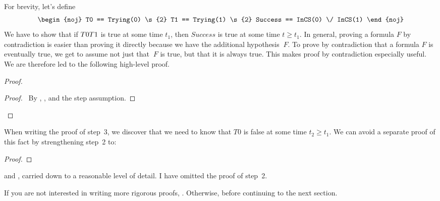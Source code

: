 \documentclass[fleqn,leqno]{article}
\begin{document}
For brevity, let's define
   \[ \begin{noj}
      T0 == Trying(0) \s{2} T1 == Trying(1) \s{2}
      Success == InCS(0) \/ InCS(1)
      \end{noj}
  \]
We have to show that if $T0 \/ T1$ is true at some time $t_{1}$, then
$Success$ is true at some time $t\geq t_{1}$.  In general, proving
a formula $F$ by contradiction is 
easier than proving it directly because we have the additional
hypothesis $~F$.  To prove by contradiction that a formula $F$ is
eventually true, we get to assume not just that $~F$ is true, but that
it is always true.  This makes proof by contradiction especially
useful.  We are therefore led to the following high-level proof.
\begin{display}
\pflongnumbers%
\beforePfSpace{10pt, 2pt, 2pt}
\afterPfSpace{10pt, 5pt, 5pt}
\interStepSpace{4pt}
\begin{proof}



\qedstep
\begin{proof}
\pf\ By , , and the step  assumption.
\end{proof}
\end{proof}
\end{display}
When writing the proof of step~3, we discover that we need to
know that $T0$ is false at some time $t_{2}\geq t_{1}$.  We can avoid
a separate proof of this fact by strengthening step~2 to:
\begin{display}
\pflongnumbers
\begin{proof}
\end{proof}
\end{display}
 and
, carried down to a reasonable
level of detail.  I have omitted the proof of step~2.

\medskip

\noindent\textsf{If you are not interested in writing more rigorous proofs,
.
Otherwise,  before continuing to the next section.}
\end{document}
